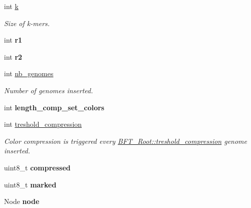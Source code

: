 \begin{DoxyCompactItemize}
\item 
int \hyperlink{structBFT__Root_ac496349ff4cba68727c5e38d4200848e}{k}
\begin{DoxyCompactList}\small\item\em Size of k-\/mers. \end{DoxyCompactList}\item 
\hypertarget{structBFT__Root_a5f9133c413279e9184248ee9df58377e}{}int {\bfseries r1}\label{structBFT__Root_a5f9133c413279e9184248ee9df58377e}

\item 
\hypertarget{structBFT__Root_a2319c2ec89e8196fad6ab66f46f52f93}{}int {\bfseries r2}\label{structBFT__Root_a2319c2ec89e8196fad6ab66f46f52f93}

\item 
int \hyperlink{structBFT__Root_aaa57149b486231b370c0d9287e7e5328}{nb\+\_\+genomes}
\begin{DoxyCompactList}\small\item\em Number of genomes inserted. \end{DoxyCompactList}\item 
\hypertarget{structBFT__Root_ab6dc409b011bf32096366e936266d871}{}int {\bfseries length\+\_\+comp\+\_\+set\+\_\+colors}\label{structBFT__Root_ab6dc409b011bf32096366e936266d871}

\item 
int \hyperlink{structBFT__Root_ac791b1bb0df480c8574095bf0444cc64}{treshold\+\_\+compression}
\begin{DoxyCompactList}\small\item\em Color compression is triggered every \hyperlink{structBFT__Root_ac791b1bb0df480c8574095bf0444cc64}{B\+F\+T\+\_\+\+Root\+::treshold\+\_\+compression} genome inserted. \end{DoxyCompactList}\item 
\hypertarget{structBFT__Root_af43416c7309bc382c787d59dac51434e}{}uint8\+\_\+t {\bfseries compressed}\label{structBFT__Root_af43416c7309bc382c787d59dac51434e}

\item 
\hypertarget{structBFT__Root_ae5f00a6cb4a5d56158d869aec2e87a38}{}uint8\+\_\+t {\bfseries marked}\label{structBFT__Root_ae5f00a6cb4a5d56158d869aec2e87a38}

\item 
\hypertarget{structBFT__Root_a996c0a58aa4e6396bde1fd3037b79f03}{}Node {\bfseries node}\label{structBFT__Root_a996c0a58aa4e6396bde1fd3037b79f03}

\end{DoxyCompactItemize}


